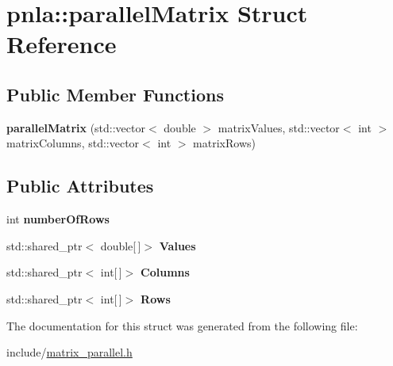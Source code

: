 \hypertarget{structpnla_1_1parallelMatrix}{}\section{pnla\+:\+:parallel\+Matrix Struct Reference}
\label{structpnla_1_1parallelMatrix}
\subsection*{Public Member Functions}
\begin{DoxyCompactItemize}
\item 
\mbox{\label{structpnla_1_1parallelMatrix_ae31446fc0ea087ba4d988010608261f2}} 
{\bfseries parallel\+Matrix} (std\+::vector$<$ double $>$ matrix\+Values, std\+::vector$<$ int $>$ matrix\+Columns, std\+::vector$<$ int $>$ matrix\+Rows)
\end{DoxyCompactItemize}
\subsection*{Public Attributes}
\begin{DoxyCompactItemize}
\item 
\mbox{\label{structpnla_1_1parallelMatrix_ab18f8fd9cde6cddadc53f50e81167b95}} 
int {\bfseries number\+Of\+Rows}
\item 
\mbox{\label{structpnla_1_1parallelMatrix_a77a8cc001cd52b8647bf35ea2b4bae90}} 
std\+::shared\+\_\+ptr$<$ double\mbox{[}$\,$\mbox{]}$>$ {\bfseries Values}
\item 
\mbox{\label{structpnla_1_1parallelMatrix_ace5ce36588ef3693488f1320d69fa94f}} 
std\+::shared\+\_\+ptr$<$ int\mbox{[}$\,$\mbox{]}$>$ {\bfseries Columns}
\item 
\mbox{\label{structpnla_1_1parallelMatrix_a1ebce8311b3f334038fb875e4df03cf4}} 
std\+::shared\+\_\+ptr$<$ int\mbox{[}$\,$\mbox{]}$>$ {\bfseries Rows}
\end{DoxyCompactItemize}


The documentation for this struct was generated from the following file\+:\begin{DoxyCompactItemize}
\item 
include/\mbox{\hyperlink{matrix__parallel_8h}{matrix\+\_\+parallel.\+h}}\end{DoxyCompactItemize}
